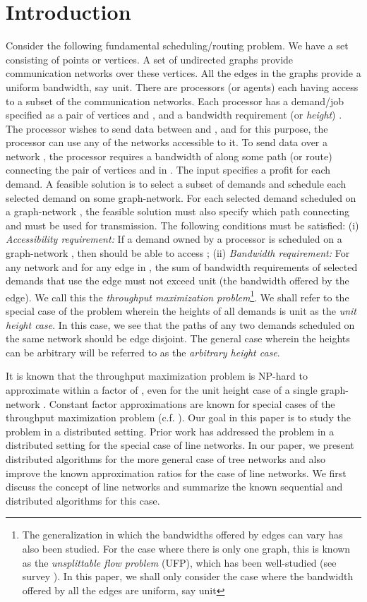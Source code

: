 \documentclass[11pt]{article}
\begin{document}
\section{Introduction}
Consider the following fundamental scheduling/routing problem.
We have a set  consisting of  points or vertices.
A set of  undirected graphs provide communication networks over these vertices.
All the edges in the graphs provide a uniform bandwidth, say  unit.
There are  processors (or agents) each having access to a subset of the communication networks.
Each processor  has a demand/job  specified as a pair of vertices  and ,
and a bandwidth requirement (or {\em height}) .
The processor  wishes to send data between  and ,
and for this purpose, the processor can use any of the networks  accessible to it.
To send data over a network , the processor  
requires a bandwidth of  along some path (or route) connecting the pair of vertices 
 and  in . The input specifies a profit for each demand.
A feasible solution is to select a subset of demands and schedule each selected demand on some graph-network.
For each selected demand  scheduled on a graph-network ,
the feasible solution must also specify which path connecting  and  must be used for transmission.
The following conditions must be satisfied:
(i) {\em Accessibility requirement: }If a demand  owned by a processor 
is scheduled on a graph-network , then  should be able to access ;
(ii) {\em Bandwidth requirement: }For any network  and for any edge  in , 
the sum of bandwidth requirements of selected demands that use the edge  must not exceed  unit 
(the bandwidth offered by the edge).
We call this the {\em throughput maximization problem}\footnote{The generalization in which the bandwidths offered by edges can vary has also been studied.
For the case where there is only one graph, this is known as the {\em unsplittable flow problem} (UFP),
which has been well-studied (see survey \cite{UFPSurvey}). 
In this paper, we shall only consider the case where the bandwidth offered by all the edges are uniform, say  unit}.
We shall refer to the special case of the problem wherein the heights of all demands is  unit 
as the {\em unit height case}.
In this case, we see that the paths of any two demands scheduled on the same network should be edge disjoint. 
The general case wherein the heights can be arbitrary will be referred
to as the {\em arbitrary height case}.


It is known that the throughput maximization problem is 
NP-hard to approximate within a factor of , even for the unit height case of a 
single graph-network \cite{EDP-Hardness}.
Constant factor approximations are known for special cases of the throughput maximization problem (c.f. \cite{AmitKumar}).
Our goal in this paper is to study the problem in a distributed setting.
Prior work has addressed the problem in a distributed setting for the special case of line networks.
In our paper, we present distributed algorithms for the more general case of tree networks
and also improve the known approximation ratios for the case of line networks.
We first discuss the concept of line networks and summarize the known sequential and distributed algorithms
for this case. \\
\end{document}
